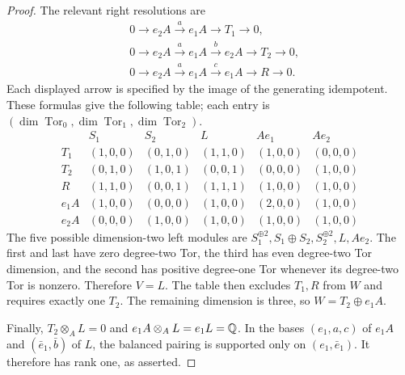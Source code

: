 \begin{proof}
The relevant right resolutions are
\[
\begin{split}
 &0\longrightarrow e_2A\xrightarrow{a}e_1A
       \longrightarrow T_1\longrightarrow0,\\
 &0\longrightarrow e_2A\xrightarrow{a}e_1A
       \xrightarrow{b}e_2A\longrightarrow T_2\longrightarrow0,\\
 &0\longrightarrow e_2A\xrightarrow{a}e_1A
       \xrightarrow{c}e_1A\longrightarrow R\longrightarrow0.
\end{split}
\]
Each displayed arrow is specified by the image of the generating
idempotent.  These formulas give the following table; each entry is
$(\dim\operatorname{Tor}_0,\dim\operatorname{Tor}_1,
\dim\operatorname{Tor}_2)$.
\[
\begin{array}{c|ccccc}
 &S_1&S_2&L&Ae_1&Ae_2\\\hline
T_1 &(1,0,0)&(0,1,0)&(1,1,0)&(1,0,0)&(0,0,0)\\
T_2 &(0,1,0)&(1,0,1)&(0,0,1)&(0,0,0)&(1,0,0)\\
R   &(1,1,0)&(0,0,1)&(1,1,1)&(1,0,0)&(1,0,0)\\
e_1A&(1,0,0)&(0,0,0)&(1,0,0)&(2,0,0)&(1,0,0)\\
e_2A&(0,0,0)&(1,0,0)&(1,0,0)&(1,0,0)&(1,0,0)
\end{array}
\]
The five possible dimension-two left modules are
$S_1^{\oplus2},S_1\oplus S_2,S_2^{\oplus2},L,Ae_2$.
The first and last have zero degree-two Tor, the third has even
degree-two Tor dimension, and the second has positive degree-one Tor
whenever its degree-two Tor is nonzero.  Therefore $V=L$.
The table then excludes $T_1,R$ from $W$ and requires exactly one
$T_2$.  The remaining dimension is three, so $W=T_2\oplus e_1A$.

Finally, $T_2\otimes_A L=0$ and $e_1A\otimes_A L=e_1L=\mathbb Q$.
In the bases $(e_1,a,c)$ of $e_1A$ and $(\bar e_1,\bar b)$ of $L$,
the balanced pairing is supported only on $(e_1,\bar e_1)$.
It therefore has rank one, as asserted.
\end{proof}

